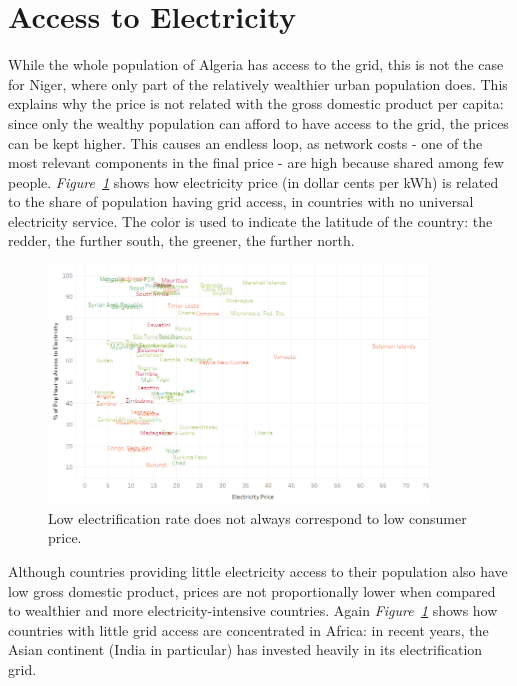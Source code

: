 \documentclass[a4paper,12pt]{book}
\begin{document}
\section{Access to Electricity}

While the whole population of Algeria has access to the grid, this is not the case for Niger, where only part of the relatively wealthier urban population does. This explains why the price is not related with the gross domestic product per capita: since only the wealthy population can afford to have access to the grid, the prices can be kept higher. This causes an endless loop, as network costs - one of the most relevant components in the final price - are high because  shared among few people. \textit{Figure~\ref{fig:northsouth}} shows how electricity price (in dollar cents per kWh) is related to the share of population having grid access, in countries with no universal electricity service. The color is used to indicate the latitude of the country: the redder, the further south, the greener, the further north.

\begin{figure}[htb]
\begin{center}
\captionsetup{justification=centering}
\includegraphics[width=0.9\textwidth]{Images/accessNAMES.png}
\caption{Low electrification rate does not always correspond to low consumer price.}
\label{fig:northsouth}
\end{center}
\end{figure}

Although countries providing little electricity access to their population also have low gross domestic product, prices are not proportionally lower when compared to wealthier and more electricity-intensive countries. Again \textit{Figure~\ref{fig:northsouth}} shows how countries with little grid access are concentrated in Africa: in recent years, the Asian continent (India in particular) has invested heavily in its electrification grid.
\end{document}

